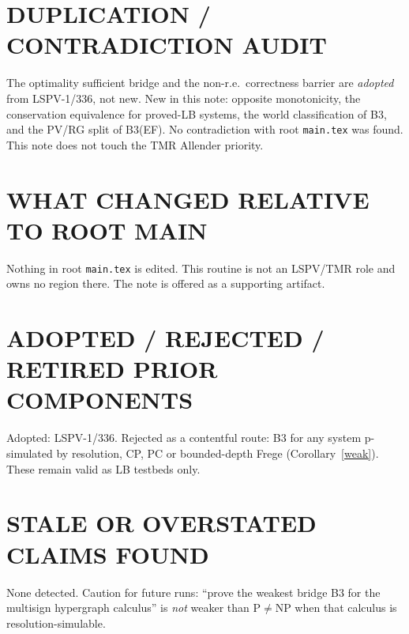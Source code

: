 \documentclass[11pt]{article}
\theoremstyle{definition}
\theoremstyle{remark}
\begin{document}
\section*{DUPLICATION / CONTRADICTION AUDIT}
The optimality sufficient bridge and the non-r.e.\ correctness barrier are \emph{adopted} from LSPV-1/336, not new. New in this note: opposite monotonicity, the conservation equivalence for proved-LB systems, the world classification of B3, and the PV/RG split of B3(EF). No contradiction with root \texttt{main.tex} was found. This note does not touch the TMR Allender priority.

\section*{WHAT CHANGED RELATIVE TO ROOT MAIN}
Nothing in root \texttt{main.tex} is edited. This routine is not an LSPV/TMR role and owns no region there. The note is offered as a supporting artifact.

\section*{ADOPTED / REJECTED / RETIRED PRIOR COMPONENTS}
Adopted: LSPV-1/336. Rejected as a contentful route: B3 for any system p-simulated by resolution, CP, PC or bounded-depth Frege (Corollary~\ref{weak}). These remain valid as LB testbeds only.

\section*{STALE OR OVERSTATED CLAIMS FOUND}
None detected. Caution for future runs: ``prove the weakest bridge B3 for the multisign hypergraph calculus'' is \emph{not} weaker than P$\ne$NP when that calculus is resolution-simulable.
\end{document}
